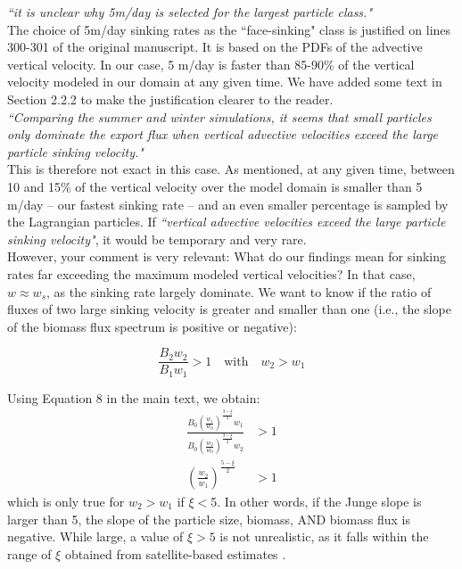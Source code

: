 \documentclass[12pt,letter]{article}
\begin{document}
\textit{``it is unclear why 5m/day is selected for the largest particle class."\\}
The choice of 5m/day sinking rates as the ``face-sinking"  class is justified on lines 300-301 of the original manuscript. It is based on the PDFs of the advective vertical velocity. In our case, 5 m/day is faster than 85-90\% of the vertical velocity modeled in our domain at any given time. We have added some text in Section 2.2.2 to make the justification clearer to the reader.\\

\textit{``Comparing the summer and winter simulations, it seems that small particles only dominate the export flux when vertical advective velocities exceed the large particle sinking velocity."\\}
This is therefore not exact in this case. As mentioned, at any given time, between 10 and 15\% of the vertical velocity over the model domain is smaller than 5 m/day -- our fastest sinking rate -- and an even smaller percentage is sampled by the Lagrangian particles. If \textit{``vertical advective velocities exceed the large particle sinking velocity"}, it would be temporary and very rare.\\

However, your comment is very relevant: What do our findings mean for sinking rates far exceeding the maximum modeled vertical velocities? In that case, $w \approx w_s$, as the sinking rate largely dominate. We want to know if the ratio of fluxes of two large sinking velocity is greater and smaller than one (i.e., the slope of the biomass flux spectrum is positive or negative):

\begin{equation}
	\frac{B_2w_2}{B_1w_1} >1 \quad \text{with} \quad w_2 > w_1
\end{equation}	

Using Equation 8 in the main text, we obtain:
\begin{align}
	\frac{B_0\left(\frac{w_1}{w_0}\right)^{\frac{3-\xi}{2}}w_1}{B_0\left(\frac{w_2}{w_0}\right)^{\frac{3-\xi}{2}}w_2} &> 1\\[.2cm]
	\left(\frac{w_2}{w_1}\right)^{\frac{5-\xi}{2}} &>1
\end{align}	
which is only true for $w_2 > w_1$ if $\xi<$5. In other words, if the Junge slope is larger than 5, the slope of the particle size, biomass, AND biomass flux is negative. While large, a value of $\xi>5$ is not unrealistic, as it falls within the range of $\xi$ obtained from satellite-based estimates \citep{Kostadinov_2009}.
\end{document}
